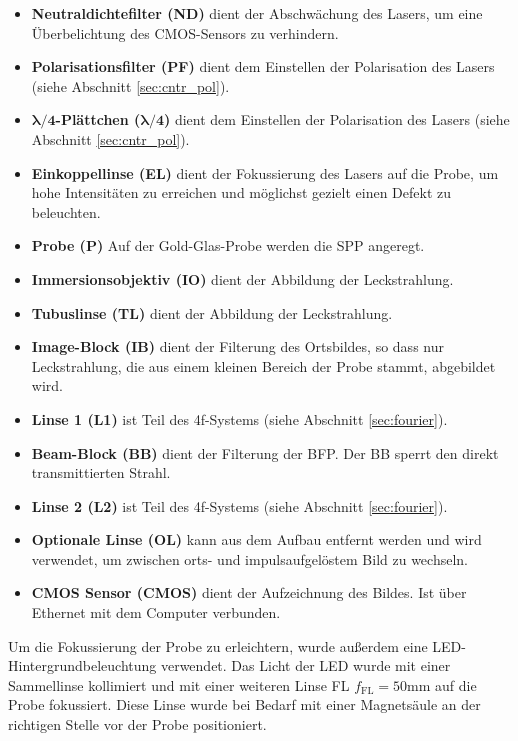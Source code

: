 \documentclass[titlepage,  ngerman]{article}
\begin{document}
		\begin{itemize}
			\item \textbf{Neutraldichtefilter (ND)} dient der Abschwächung des Lasers, um eine Überbelichtung des CMOS-Sensors zu verhindern.
			\item \textbf{Polarisationsfilter (PF)} dient dem Einstellen der Polarisation des Lasers (siehe Abschnitt \ref{sec:cntr_pol}).
			\item $\boldsymbol{\lambda / 4}$\textbf{-Plättchen (}$\boldsymbol{\lambda / 4}$\textbf{)} dient dem Einstellen der Polarisation des Lasers (siehe Abschnitt \ref{sec:cntr_pol}).
			\item \textbf{Einkoppellinse (EL)} dient der Fokussierung des Lasers auf die Probe, um hohe Intensitäten zu erreichen und möglichst gezielt einen Defekt zu beleuchten.
			\item \textbf{Probe (P)} Auf der Gold-Glas-Probe werden die SPP angeregt.
			\item \textbf{Immersionsobjektiv (IO)} dient der Abbildung der Leckstrahlung.
			\item \textbf{Tubuslinse (TL)} dient der Abbildung der Leckstrahlung.
			\item \textbf{Image-Block (IB)} dient der Filterung des Ortsbildes, so dass nur Leckstrahlung, die aus einem kleinen Bereich der Probe stammt, abgebildet wird.			
			\item \textbf{Linse 1 (L1)} ist Teil des 4f-Systems (siehe Abschnitt \ref{sec:fourier}).
			\item \textbf{Beam-Block (BB)} dient der Filterung der BFP. Der BB sperrt den direkt transmittierten Strahl.			
			\item \textbf{Linse 2 (L2)} ist Teil des 4f-Systems (siehe Abschnitt \ref{sec:fourier}).
			\item \textbf{Optionale Linse (OL)} kann aus dem Aufbau entfernt werden und wird verwendet, um zwischen orts- und impulsaufgelöstem Bild zu wechseln.
			\item \textbf{CMOS Sensor (CMOS)}  dient der Aufzeichnung des Bildes. Ist über Ethernet mit dem Computer verbunden.			
		\end{itemize}
		Um die Fokussierung der Probe zu erleichtern, wurde außerdem eine LED-Hintergrundbeleuchtung verwendet. Das Licht der LED wurde mit einer Sammellinse kollimiert und mit einer weiteren Linse FL $f_{\mathrm{FL}}=50\mathrm{mm}$ auf die  Probe fokussiert. Diese Linse wurde bei Bedarf mit einer Magnetsäule an der richtigen Stelle vor der Probe positioniert.
		
\end{document}
